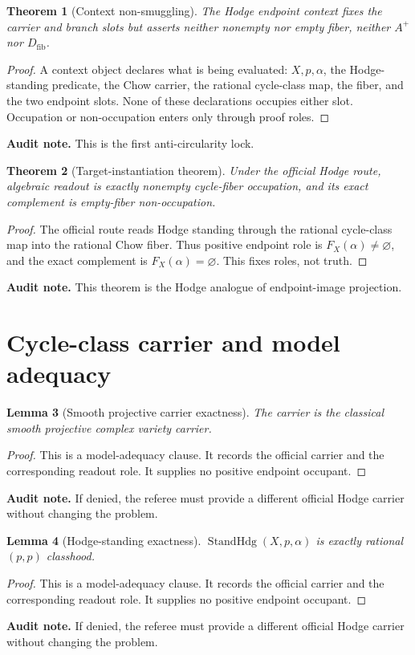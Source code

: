 \documentclass[11pt]{article}
\newtheorem{theorem}{Theorem}[section]
\newtheorem{lemma}[theorem]{Lemma}
\newcommand{\StandHdg}{\operatorname{StandHdg}}
\begin{document}
\begin{theorem}[Context non-smuggling]
The Hodge endpoint context fixes the carrier and branch slots but asserts neither nonempty nor empty fiber, neither $A^+$ nor $D_{\mathrm{fib}}$.
\end{theorem}
\begin{proof}
A context object declares what is being evaluated: $X,p,\alpha$, the Hodge-standing predicate, the Chow carrier, the rational cycle-class map, the fiber, and the two endpoint slots. None of these declarations occupies either slot. Occupation or non-occupation enters only through proof roles.
\end{proof}
\par\noindent\textbf{Audit note.} This is the first anti-circularity lock.


\begin{theorem}[Target-instantiation theorem]
Under the official Hodge route, algebraic readout is exactly nonempty cycle-fiber occupation, and its exact complement is empty-fiber non-occupation.
\end{theorem}
\begin{proof}
The official route reads Hodge standing through the rational cycle-class map into the rational Chow fiber. Thus positive endpoint role is $F_X(\alpha)\neq\varnothing$, and the exact complement is $F_X(\alpha)=\varnothing$. This fixes roles, not truth.
\end{proof}
\par\noindent\textbf{Audit note.} This theorem is the Hodge analogue of endpoint-image projection.


\section{Cycle-class carrier and model adequacy}


\begin{lemma}[Smooth projective carrier exactness]
The carrier is the classical smooth projective complex variety carrier.
\end{lemma}
\begin{proof}
This is a model-adequacy clause. It records the official carrier and the corresponding readout role. It supplies no positive endpoint occupant.
\end{proof}
\par\noindent\textbf{Audit note.} If denied, the referee must provide a different official Hodge carrier without changing the problem.


\begin{lemma}[Hodge-standing exactness]
$\StandHdg(X,p,\alpha)$ is exactly rational $(p,p)$ classhood.
\end{lemma}
\begin{proof}
This is a model-adequacy clause. It records the official carrier and the corresponding readout role. It supplies no positive endpoint occupant.
\end{proof}
\par\noindent\textbf{Audit note.} If denied, the referee must provide a different official Hodge carrier without changing the problem.
\end{document}
